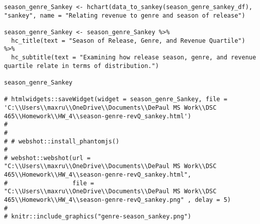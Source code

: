 \begin{lstlisting}
season_genre_Sankey <- hchart(data_to_sankey(season_genre_sankey_df), "sankey", name = "Relating revenue to genre and season of release")

season_genre_Sankey <- season_genre_Sankey %>%
  hc_title(text = "Season of Release, Genre, and Revenue Quartile") %>%
  hc_subtitle(text = "Examining how release season, genre, and revenue quartile relate in terms of distribution.")

season_genre_Sankey

# htmlwidgets::saveWidget(widget = season_genre_Sankey, file = 'C:\\Users\\maxru\\OneDrive\\Documents\\DePaul MS Work\\DSC 465\\Homework\\HW_4\\season-genre-revQ_sankey.html')
# 
# 
# # webshot::install_phantomjs()
# 
# webshot::webshot(url = "C:\\Users\\maxru\\OneDrive\\Documents\\DePaul MS Work\\DSC 465\\Homework\\HW_4\\season-genre-revQ_sankey.html",
#                  file = "C:\\Users\\maxru\\OneDrive\\Documents\\DePaul MS Work\\DSC 465\\Homework\\HW_4\\season-genre-revQ_sankey.png" , delay = 5)
# 
# knitr::include_graphics("genre-season_sankey.png")
\end{lstlisting}